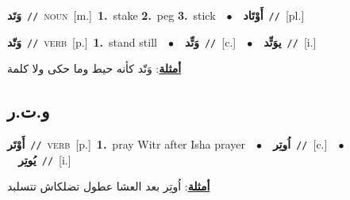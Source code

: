 \documentclass[10pt,a4paper,twoside]{article} %
\begin{document}
\begin{multicols}{2}
{\setlength\topsep{0pt}\textbf{\foreignlanguage{arabic}{وَتَد}}\ {\color{gray}\texttt{//}\color{black}}\ \textsc{noun}\ [m.]\ \textbf{1.}~stake  \textbf{2.}~peg  \textbf{3.}~stick\ \ $\bullet$\ \ \setlength\topsep{0pt}\textbf{\foreignlanguage{arabic}{أَوْتَاد}}\ {\color{gray}\texttt{//}\color{black}}\ [pl.]\ } \vspace{2mm}

{\setlength\topsep{0pt}\textbf{\foreignlanguage{arabic}{وَتّد}}\ {\color{gray}\texttt{//}\color{black}}\ \textsc{verb}\ [p.]\ \textbf{1.}~stand still\ \ $\bullet$\ \ \setlength\topsep{0pt}\textbf{\foreignlanguage{arabic}{وَتِّد}}\ {\color{gray}\texttt{//}\color{black}}\ [c.]\ \ $\bullet$\ \ \setlength\topsep{0pt}\textbf{\foreignlanguage{arabic}{يوَتِّد}}\ {\color{gray}\texttt{//}\color{black}}\ [i.]\  \begin{flushright}\color{gray}\foreignlanguage{arabic}{\textbf{\underline{\foreignlanguage{arabic}{أمثلة}}}: وَتّد كأنه حيط وما حكى ولا كلمة}\end{flushright}\color{black}} \vspace{2mm}

\vspace{-3mm}
\subsection*{\color{blue}\foreignlanguage{arabic}{و.ت.ر}\color{blue}{}} 

{\setlength\topsep{0pt}\textbf{\foreignlanguage{arabic}{أَوْتَر}}\ {\color{gray}\texttt{//}\color{black}}\ \textsc{verb}\ [p.]\ \textbf{1.}~pray Witr after Isha prayer\ \ $\bullet$\ \ \setlength\topsep{0pt}\textbf{\foreignlanguage{arabic}{اُوتِر}}\ {\color{gray}\texttt{//}\color{black}}\ [c.]\ \ $\bullet$\ \ \setlength\topsep{0pt}\textbf{\foreignlanguage{arabic}{يُوتِر}}\ {\color{gray}\texttt{//}\color{black}}\ [i.]\  \begin{flushright}\color{gray}\foreignlanguage{arabic}{\textbf{\underline{\foreignlanguage{arabic}{أمثلة}}}: اُوتِر بعد العشا عطول تضلكاش تتسلبد}\end{flushright}\color{black}} \vspace{2mm}


\end{multicols}
\end{document}
